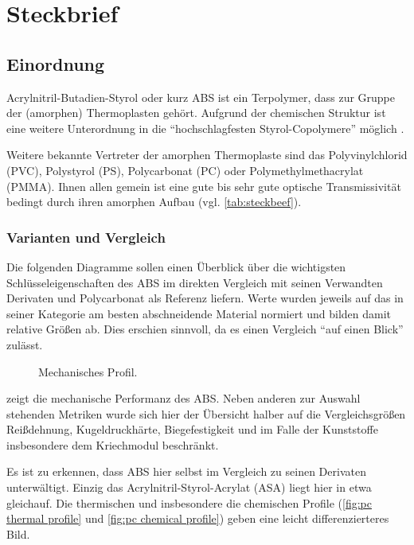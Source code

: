 \chapter{Steckbrief}
    \section{Einordnung}
        Acrylnitril-Butadien-Styrol oder kurz ABS ist ein Terpolymer, dass zur Gruppe der (amorphen) Thermoplasten gehört. Aufgrund
        der chemischen Struktur ist eine weitere Unterordnung in die \enquote{hochschlagfesten Styrol-Copolymere} möglich \cite{Eyerer.2020.Polymer.Engineering.1}.

        Weitere bekannte Vertreter der amorphen Thermoplaste sind das Polyvinylchlorid (PVC), Polystyrol (PS), Polycarbonat (PC)
        oder Polymethylmethacrylat (PMMA). Ihnen allen gemein ist eine gute bis sehr gute optische Transmissivität bedingt durch ihren amorphen Aufbau (vgl. \cref{tab:steckbeef}).
        \subsection{Varianten und Vergleich}
            Die folgenden Diagramme sollen einen Überblick über die wichtigsten Schlüsseleigenschaften des ABS im direkten Vergleich
            mit seinen Verwandten Derivaten und Polycarbonat als Referenz liefern. Werte wurden jeweils auf das in seiner
            Kategorie am besten abschneidende Material normiert und bilden damit relative Größen ab. Dies erschien sinnvoll,
            da es einen Vergleich \enquote{auf einen Blick} zulässt.

            \begin{figure}[h]
                \centering
                
                \caption[Mechanisches Profil]{Mechanisches Profil.}
                \label{fig:pc mechanical profile}
            \end{figure}\par
             zeigt die mechanische Performanz des ABS\@. Neben anderen zur Auswahl stehenden
            Metriken wurde sich hier der Übersicht halber auf die Vergleichsgrößen Reißdehnung, Kugeldruckhärte, Biegefestigkeit
            und im Falle der Kunststoffe insbesondere dem Kriechmodul beschränkt.

            Es ist zu erkennen, dass ABS hier selbst im Vergleich zu seinen Derivaten unterwältigt. Einzig das
            Acrylnitril-Styrol-Acrylat (ASA) liegt hier in etwa gleichauf. Die thermischen und insbesondere die chemischen Profile
            (\cref{fig:pc thermal profile} und \cref{fig:pc chemical profile}) geben eine leicht differenzierteres Bild.

